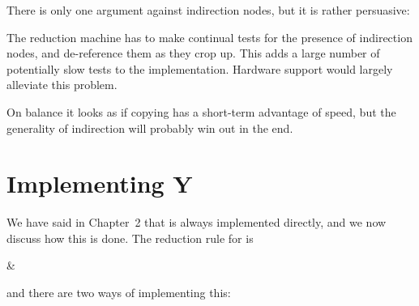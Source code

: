 There is only one argument against indirection nodes, but it is rather
persuasive:

\begin{numbered}
    \item The reduction machine has to make continual tests for the presence of
    indirection nodes, and de-reference them as they crop up. This adds a
    large number of potentially slow tests to the implementation. Hardware
    support would largely alleviate this problem.
\end{numbered}

\noindent On balance it looks as if copying has a short-term advantage of speed, but the
generality of indirection will probably win out in the end.

\section{Implementing Y}

We have said in Chapter~2 that  is always implemented directly, and we now
discuss how this is done. The reduction rule for  is
\begin{letalign}
     & \reduction{} 
\end{letalign}
and there are two ways of implementing this:

